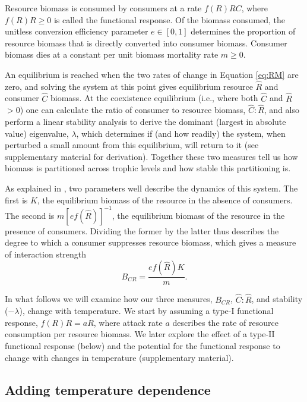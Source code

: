 \documentclass[11pt]{article}
\begin{document}
Resource biomass is consumed by consumers at a rate $f(R) R C$, where $f(R) R\geq0$ is called the functional response.
Of the biomass consumed, the unitless conversion efficiency parameter $e\in[0,1]$ determines the proportion of resource biomass that is directly converted into consumer biomass.
Consumer biomass dies at a constant per unit biomass mortality rate $m\geq0$.

An equilibrium is reached when the two rates of change in Equation \eqref{eq:RM} are zero, and solving the system at this point gives equilibrium resource $\hat{R}$ and consumer $\hat{C}$ biomass.
At the coexistence equilibrium (i.e., where both $\hat{C}$ and $\hat{R}$ $>0$) one can calculate the ratio of consumer to resource biomass, $\hat{C}:\hat{R}$, and also perform a linear stability analysis to derive the dominant (largest in absolute value) eigenvalue, $\lambda$, which determines if (and how readily) the system, when perturbed a small amount from this equilibrium, will return to it (see supplementary material for derivation).
Together these two measures tell us how biomass is partitioned across trophic levels and how stable this partitioning is.

As explained in \cite{Gilbert2014}, two parameters well describe the dynamics of this system.
The first is $K$, the equilibrium biomass of the resource in the absence of consumers. 
The second is $m [e f(\hat{R})]^{-1}$, the equilibrium biomass of the resource in the presence of consumers. 
Dividing the former by the latter thus describes the degree to which a consumer suppresses resource biomass, which gives a measure of interaction strength
\begin{equation}
\label{BCR}
B_{CR} = \frac{e f(\hat{R}) K}{m}.
\end{equation}

In what follows we will examine how our three measures, $B_{CR}$, $\hat{C}:\hat{R}$, and stability ($-\lambda$), change with temperature.
We start by assuming a type-I functional response, $f(R)R = aR$, where attack rate $a$ describes the rate of resource consumption per resource biomass.
We later explore the effect of a type-II functional response (below) and the potential for the functional response to change with changes in temperature (supplementary material).

\subsection*{Adding temperature dependence}
\end{document}
